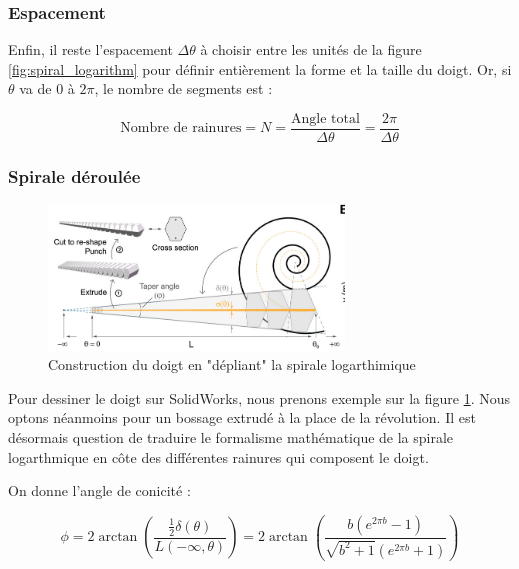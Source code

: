 \documentclass[a4paper, 11pt]{report}
\begin{document}
        \subsubsection{Espacement}
            
            Enfin, il reste l'espacement $\Delta\theta$ à choisir entre les unités de la figure \ref{fig:spiral_logarithm} pour définir entièrement la forme et la taille du doigt. \cite{wang_spirobs_2025} Or, si $\theta$ va de $0$ à $2\pi$, le nombre de segments est :
        
            \begin{equation}
            \text{Nombre de rainures} = N = \frac{\text{Angle total}}{\Delta\theta} = \frac{2\pi}{\Delta\theta}
            \label{eq:nb_segment}
            \end{equation}

        \subsubsection{Spirale déroulée}

            \begin{figure}
                \centering
                \includegraphics[width=0.7\textwidth]{Figures/draw_solidworks.png}
                \caption{Construction du doigt en "dépliant" la spirale logarthimique \cite{wang_spirobs_2025}}
                \label{fig:draw_solidworks}
            \end{figure}

            Pour dessiner le doigt sur SolidWorks, nous prenons exemple sur la figure \ref{fig:draw_solidworks}. Nous optons néanmoins pour un bossage extrudé à la place de la révolution. Il est désormais question de traduire le formalisme mathématique de la spirale logarthmique en côte des différentes rainures qui composent le doigt.

            On donne l'angle de conicité :

            \begin{equation}
            \phi = 2\arctan \left(
                \frac{\frac{1}{2}\delta(\theta)}{L(-\infty, \theta)}
                \right) = 2 \arctan\left(\frac{b(e^{2\pi b}-1)}{\sqrt{b^2+1} \left(e^{2\pi b}+1\right)}\right)
            \label{eq:angle_de_conicite}
            \end{equation}
\end{document}
